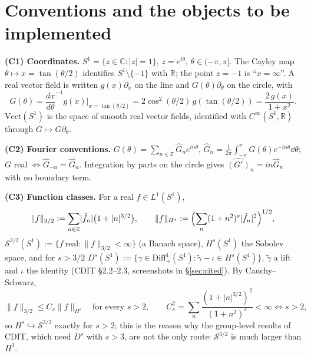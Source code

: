 \documentclass[11pt]{article}
\newcommand{\Vect}{\mathrm{Vect}}
\newcommand{\norm}[1]{\lVert #1\rVert}
\newcommand{\abs}[1]{\lvert #1\rvert}
\begin{document}
\tableofcontents


\section{Conventions and the objects to be implemented}\label{sec:conv}

\textbf{(C1) Coordinates.}  $S^1=\{z\in\mathbb C:\abs z=1\}$, $z=e^{i\theta}$, $\theta\in(-\pi,\pi]$.  The Cayley map
$\theta\mapsto x=\tan(\theta/2)$ identifies $S^1\setminus\{-1\}$ with $\mathbb R$; the point $z=-1$ is ``$x=\infty$''.
A real vector field is written $g(x)\partial_x$ on the line and $G(\theta)\partial_\theta$ on the circle, with
\begin{equation}\label{eq:field-transf}
 G(\theta)=\frac{dx}{d\theta}^{-1}g(x)\Big|_{x=\tan(\theta/2)}=2\cos^2(\theta/2)\,g(\tan(\theta/2))=\frac{2\,g(x)}{1+x^2}.
\end{equation}
$\Vect(S^1)$ is the space of smooth real vector fields, identified with $C^\infty(S^1,\mathbb R)$ through $G\mapsto G\partial_\theta$.

\textbf{(C2) Fourier conventions.}  $G(\theta)=\sum_{n\in\mathbb Z}\hat G_ne^{in\theta}$,
$\hat G_n=\frac1{2\pi}\int_{-\pi}^{\pi}G(\theta)e^{-in\theta}\dd\theta$; $G$ real $\iff\hat G_{-n}=\overline{\hat G_n}$.
Integration by parts on the circle gives $\widehat{(G')}_n=in\hat G_n$ with no boundary term.

\textbf{(C3) Function classes.}  For a real $f\in L^1(S^1)$,
\begin{equation}\label{eq:norms}
 \norm f_{3/2}:=\sum_{n\in\mathbb Z}\abs{\hat f_n}\bigl(1+\abs n^{3/2}\bigr),\qquad
 \norm f_{H^s}:=\Bigl(\sum_{n}(1+n^2)^s\abs{\hat f_n}^2\Bigr)^{1/2},
\end{equation}
$\mathcal S^{3/2}(S^1):=\{f\ \text{real}:\norm f_{3/2}<\infty\}$ (a Banach space), $H^s(S^1)$ the Sobolev space, and for $s>3/2$
$D^s(S^1):=\{\gamma\in\mathrm{Diff}^1_+(S^1):\tilde\gamma-\iota\in H^s(S^1)\}$, $\tilde\gamma$ a lift and $\iota$ the identity
(CDIT \S2.2--2.3, screenshots in \S\ref{sec:cited}).  By Cauchy--Schwarz,
\begin{equation}\label{eq:embed}
 \norm f_{3/2}\le C_s\norm f_{H^s}\quad\text{for every }s>2,\qquad
 C_s^2=\sum_n\frac{(1+\abs n^{3/2})^2}{(1+n^2)^{s}}<\infty\iff s>2,
\end{equation}
so $H^s\hookrightarrow\mathcal S^{3/2}$ exactly for $s>2$; this is the reason why the group-level results of CDIT, which
need $D^s$ with $s>3$, are not the only route: $\mathcal S^{3/2}$ is much larger than $H^3$.
\end{document}

